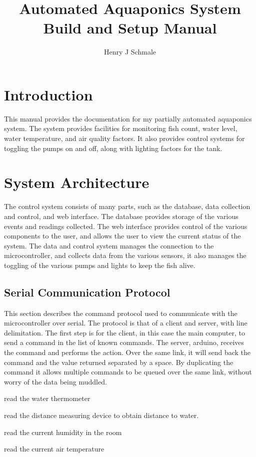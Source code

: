 \documentclass[american,man,12pt]{apa6}
\title{Automated Aquaponics System Build and Setup Manual}
\author{Henry J Schmale}
\affiliation{Harrisburg University of Science and Technology}
\begin{document}
\maketitle

\section{Introduction}
This manual provides the documentation for my partially automated aquaponics
system. The system provides facilities for monitoring fish count, water level,
water temperature, and air quality factors. It also provides control systems
for toggling the pumps on and off, along with lighting factors for the tank.

\section{System Architecture}
The control system consists of many parts, such as the database, data collection
and control, and web interface. The database provides storage of the various
events and readings collected. The web interface provides control of the various
components to the user, and allows the user to view the current status of the system.
The data and control system manages the connection to the microcontroller, and collects
data from the various sensors, it also manages the toggling of the various pumps and
lights to keep the fish alive.



\subsection{Serial Communication Protocol}
This section describes the command protocol used to communicate with the
microcontroller over serial. The protocol is that of a client and server,
with line delimitation. The first step is for the client, in this case the
main computer, to send a command in the list of known commands. The server,
arduino, receives the command and performs the action. Over the same link, it
will send back the command and the value returned separated by a space. By
duplicating the command it allows multiple commands to be queued over the same
link, without worry of the data being muddled.

\begin{description}[style=nextline]
	\item[rWatThm] read the water thermometer
	\item[rdWaLvl] read the distance measuring device to obtain distance to water.
	\item[rdHumid] read the current humidity in the room
	\item[rdAirTm] read the current air temperature
\end{description}
\end{document}

